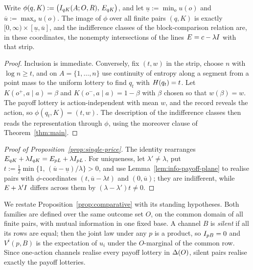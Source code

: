 \begin{lemma}\label{lem:info-payoff-plane}
Write $\phi(q,K):=\bigl(I_{qK}(A;O,R),\,E_{qK}\bigr)$, and let $\underline u:=\min_ou(o)$ and
$\overline u:=\max_ou(o)$.  The image of $\phi$ over all finite pairs $(q,K)$ is exactly
$[0,\infty)\times[\underline u,\overline u]$, and the indifference classes of the block-comparison relation are,
in these coordinates, the nonempty intersections of the lines $E=c-\lambda I$ with that strip.
\end{lemma}

\begin{proof}
Inclusion is immediate.  Conversely, fix $(t,w)$ in the strip, choose $n$ with $\log n\ge t$, and on
$A=\{1,\dots,n\}$ use continuity of entropy along a segment from a point mass to the uniform lottery to find
$q_t$ with $H(q_t)=t$.  Let $K(o^+,a\mid a)=\beta$ and $K(o^-,a\mid a)=1-\beta$ with $\beta$ chosen so that
$w(\beta)=w$.  The payoff lottery is action-independent with mean $w$, and the record reveals the action, so
$\phi(q_t,K)=(t,w)$.  The description of the indifference classes then reads the representation through $\phi$,
using the moreover clause of Theorem~\ref{thm:main}.
\end{proof}

\begin{proof}[Proof of Proposition~\ref{prop:single-price}]
The identity rearranges $E_{qK}+\lambda I_{qK}=E_{pL}+\lambda I_{pL}$.  For uniqueness, let
$\lambda'\ne\lambda$, put $t:=\tfrac12\min\{1,\,(\overline u-\underline u)/\lambda\}>0$, and use
Lemma~\ref{lem:info-payoff-plane} to realise pairs with $\phi$-coordinates $(t,\overline u-\lambda t)$ and
$(0,\overline u)$; they are indifferent, while $E+\lambda'I$ differs across them by $(\lambda-\lambda')t\ne0$.
\end{proof}

We restate Proposition~\ref{prop:comparative} with its standing hypotheses.  Both families are defined over the
same outcome set $O$, on the common domain of all finite pairs, with mutual information in one fixed base.  A
channel $B$ is \emph{silent} if all its rows are equal; then the joint law under any $p$ is a product, so
$I_{pB}=0$ and $V^i(p,B)$ is the expectation of $u_i$ under the $O$-marginal of the common row.  Since
one-action channels realise every payoff lottery in $\Delta(O)$, silent pairs realise exactly the payoff lotteries.


